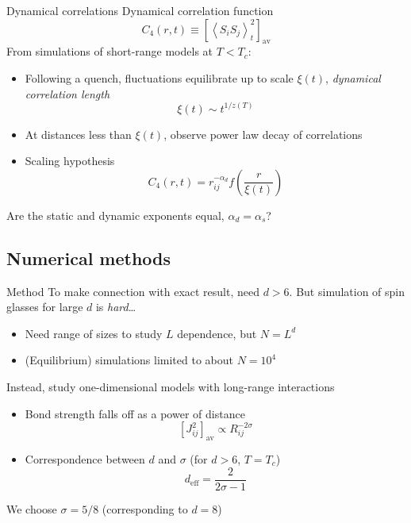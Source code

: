 \documentclass{beamer}
\newcommand{\av}[1]{\left<#1\right>}
\newcommand{\del}[1]{\left(#1\right)}
\newcommand{\sbr}[1]{\left[#1\right]}
\newcommand{\dav}[1]{\sbr{#1}_{\text{av}}}
\begin{document}
\begin{frame}{Dynamical correlations}
  Dynamical correlation function
  \begin{equation*}
    C_4(r,t) \equiv \dav{\av{S_i S_j}^2_t}
  \end{equation*}
  From simulations of short-range models at $T<T_c$:
  \begin{itemize}
    \item Following a quench, fluctuations equilibrate up to scale $\xi(t)$,
      \emph{dynamical correlation length}
      \begin{equation*}
        \xi(t) \sim t^{1/z(T)}
      \end{equation*}
    \item At distances less than $\xi(t)$, observe \alert{power law decay} of
      correlations
    \item Scaling hypothesis
    \begin{equation*}
        C_4(r,t) = r_{ij}^{-\alpha_d} f\del{\frac{r}{\xi(t)}}
    \end{equation*}
  \end{itemize}
  \alert{Are the static and dynamic exponents equal, $\alpha_d=\alpha_s$?}
\end{frame}


\subsection{Numerical methods}

\begin{frame}{Method}
  To make connection with exact result, need $d>6$. But simulation of spin
  glasses for large $d$ is \emph{hard}\dots
  \begin{itemize}
    \item Need range of sizes to study $L$ dependence, but $N=L^d$
    \item (Equilibrium) simulations limited to about $N=10^4$
  \end{itemize}
  Instead, study \alert{one-dimensional} models with \alert{long-range}
  interactions
  \begin{itemize}
    \item Bond strength falls off as a power of distance
      \begin{equation*}
        \dav{J_{ij}^2} \propto R_{ij}^{-2\sigma}
      \end{equation*}
    \item Correspondence between $d$ and $\sigma$ (for $d>6$, $T=T_c$)
      \begin{equation*}
        \boxed{d_{\text{eff}} = \frac{2}{2\sigma - 1}}
      \end{equation*}
  \end{itemize}
  We choose \alert{$\sigma=5/8$} (corresponding to \alert{$d=8$})
\end{frame}
\end{document}
